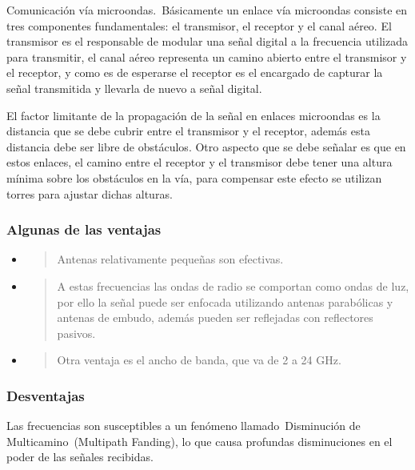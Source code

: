 \documentclass[a4paper]{article}
\begin{document}
Comunicación vía microondas.~Básicamente un enlace vía microondas
consiste en tres componentes fundamentales: el transmisor, el receptor y
el canal aéreo. El transmisor es el responsable de modular una señal
digital a la frecuencia utilizada para transmitir, el canal aéreo
representa un camino abierto entre el transmisor y el receptor, y como
es de esperarse el receptor es el encargado de capturar la señal
transmitida y llevarla de nuevo a señal digital.

El factor limitante de la propagación de la señal en enlaces microondas
es la distancia que se debe cubrir entre el transmisor y el receptor,
además esta distancia debe ser libre de obstáculos. Otro aspecto que se
debe señalar es que en estos enlaces, el camino entre el receptor y el
transmisor debe tener una altura mínima sobre los obstáculos en la vía,
para compensar este efecto se utilizan torres para ajustar dichas
alturas.

\subsubsection{Algunas de las ventajas}\label{algunas-de-las-ventajas}

\begin{itemize}
\item
  \begin{quote}
  Antenas relativamente pequeñas son efectivas.
  \end{quote}
\item
  \begin{quote}
  A estas frecuencias las ondas de radio se comportan como ondas de luz,
  por ello la señal puede ser enfocada utilizando antenas parabólicas y
  antenas de embudo, además pueden ser reflejadas con reflectores
  pasivos.
  \end{quote}
\item
  \begin{quote}
  Otra ventaja es el ancho de banda, que va de 2 a 24 GHz.
  \end{quote}
\end{itemize}

\subsubsection{Desventajas}\label{desventajas}

Las frecuencias son susceptibles a un fenómeno llamado~Disminución de
Multicamino~(Multipath Fanding), lo que causa profundas disminuciones en
el poder de las señales recibidas.
\end{document}
